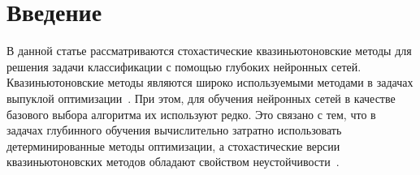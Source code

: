 \documentclass[preprint,12pt]{elsarticle}
\renewenvironment{abstract}{\global\setbox\absbox=\vbox\bgroup
  \hsize=\textwidth\def\baselinestretch{1}%
  \noindent\unskip\textbf{Abstract}
 \par\medskip\noindent\unskip\ignorespaces}
 {\egroup}
\begin{document}


\section{Введение}
\label{S:0}
В данной статье рассматриваются стохастические  квазиньютоновские методы для решения задачи классификации с помощью глубоких нейронных сетей. Квазиньютоновские методы являются широко используемыми методами в задачах выпуклой оптимизации~\cite{BBorig,BFGSorig, numopt}. При этом, для обучения нейронных сетей в качестве базового выбора алгоритма их используют редко. Это связано с тем, что в задачах глубинного обучения вычислительно затратно использовать детерминированные методы оптимизации, а стохастические версии квазиньютоновских методов обладают свойством неустойчивости~\cite{LBFGSunstable,barzilaiborwein}.
\end{document}
